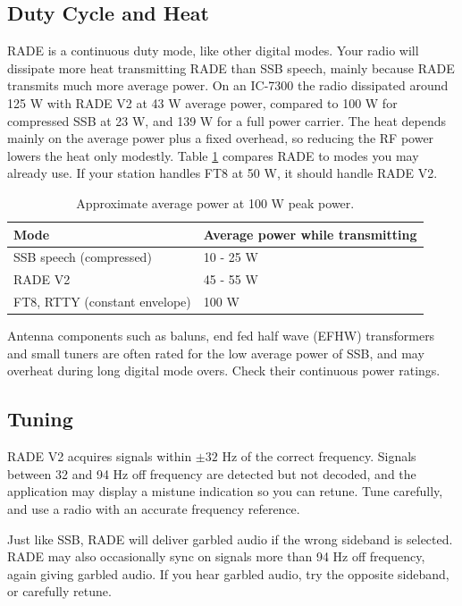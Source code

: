 \documentclass{article}
\begin{document}
\subsection{Duty Cycle and Heat}

RADE is a continuous duty mode, like other digital modes.  Your radio will dissipate more heat transmitting RADE than SSB speech, mainly because RADE transmits much more average power.  On an IC-7300 the radio dissipated around 125 \si{W} with RADE V2 at 43 \si{W} average power, compared to 100 \si{W} for compressed SSB at 23 \si{W}, and 139 \si{W} for a full power carrier.  The heat depends mainly on the average power plus a fixed overhead, so reducing the RF power lowers the heat only modestly.  Table \ref{tab:avg_power_modes} compares RADE to modes you may already use.  If your station handles FT8 at 50 \si{W}, it should handle RADE V2.

\begin{table}[H]
\caption{Approximate average power at 100 \si{W} peak power.}
\label{tab:avg_power_modes}
\centering
\begin{tabular}{ l | l }
 \hline
 Mode & Average power while transmitting \\
 \hline
 SSB speech (compressed) & 10 - 25 \si{W} \\
 RADE V2 & 45 - 55 \si{W} \\
 FT8, RTTY (constant envelope) & 100 \si{W} \\
 \hline
\end{tabular}
\end{table}

Antenna components such as baluns, end fed half wave (EFHW) transformers and small tuners are often rated for the low average power of SSB, and may overheat during long digital mode overs.  Check their continuous power ratings.

\subsection{Tuning}

RADE V2 acquires signals within $\pm 32$ \si{Hz} of the correct frequency.  Signals between 32 and 94 \si{Hz} off frequency are detected but not decoded, and the application may display a mistune indication so you can retune.  Tune carefully, and use a radio with an accurate frequency reference.

Just like SSB, RADE will deliver garbled audio if the wrong sideband is selected.  RADE may also occasionally sync on signals more than 94 \si{Hz} off frequency, again giving garbled audio.  If you hear garbled audio, try the opposite sideband, or carefully retune.
\end{document}
